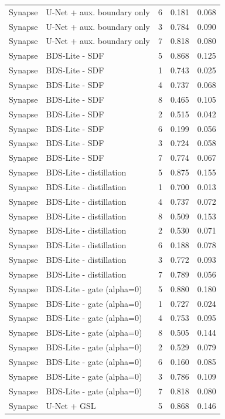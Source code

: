 \begin{longtable}{lllll}
Synapse & U-Net + aux. boundary only & 6 & 0.181 & 0.068 \\
Synapse & U-Net + aux. boundary only & 3 & 0.784 & 0.090 \\
Synapse & U-Net + aux. boundary only & 7 & 0.818 & 0.080 \\
Synapse & BDS-Lite - SDF & 5 & 0.868 & 0.125 \\
Synapse & BDS-Lite - SDF & 1 & 0.743 & 0.025 \\
Synapse & BDS-Lite - SDF & 4 & 0.737 & 0.068 \\
Synapse & BDS-Lite - SDF & 8 & 0.465 & 0.105 \\
Synapse & BDS-Lite - SDF & 2 & 0.515 & 0.042 \\
Synapse & BDS-Lite - SDF & 6 & 0.199 & 0.056 \\
Synapse & BDS-Lite - SDF & 3 & 0.724 & 0.058 \\
Synapse & BDS-Lite - SDF & 7 & 0.774 & 0.067 \\
Synapse & BDS-Lite - distillation & 5 & 0.875 & 0.155 \\
Synapse & BDS-Lite - distillation & 1 & 0.700 & 0.013 \\
Synapse & BDS-Lite - distillation & 4 & 0.737 & 0.072 \\
Synapse & BDS-Lite - distillation & 8 & 0.509 & 0.153 \\
Synapse & BDS-Lite - distillation & 2 & 0.530 & 0.071 \\
Synapse & BDS-Lite - distillation & 6 & 0.188 & 0.078 \\
Synapse & BDS-Lite - distillation & 3 & 0.772 & 0.093 \\
Synapse & BDS-Lite - distillation & 7 & 0.789 & 0.056 \\
Synapse & BDS-Lite - gate (alpha=0) & 5 & 0.880 & 0.180 \\
Synapse & BDS-Lite - gate (alpha=0) & 1 & 0.727 & 0.024 \\
Synapse & BDS-Lite - gate (alpha=0) & 4 & 0.753 & 0.095 \\
Synapse & BDS-Lite - gate (alpha=0) & 8 & 0.505 & 0.144 \\
Synapse & BDS-Lite - gate (alpha=0) & 2 & 0.529 & 0.079 \\
Synapse & BDS-Lite - gate (alpha=0) & 6 & 0.160 & 0.085 \\
Synapse & BDS-Lite - gate (alpha=0) & 3 & 0.786 & 0.109 \\
Synapse & BDS-Lite - gate (alpha=0) & 7 & 0.818 & 0.080 \\
Synapse & U-Net + GSL & 5 & 0.868 & 0.146 \\

\end{longtable}
